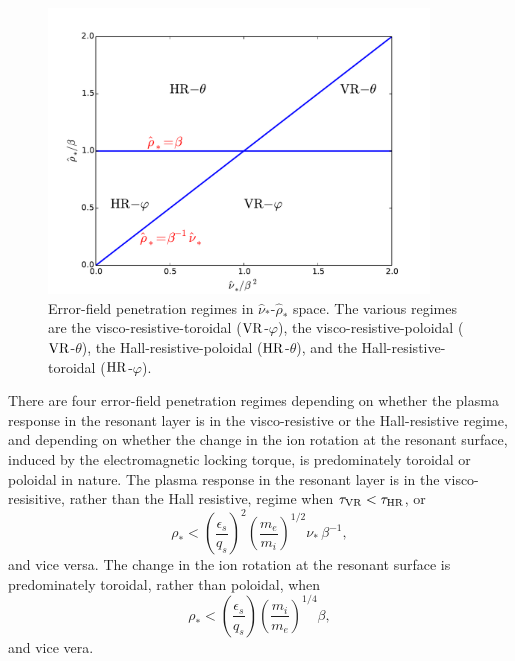 \documentclass[notitlepage,12pt]{article}
\begin{document}
\begin{figure}[t]
\centerline{\includegraphics[width=0.9\textwidth]{Scaling.pdf}}
\caption{Error-field penetration regimes in $\hat{\nu}_\ast$-$\hat{\rho}_\ast$ space. The various regimes are the
visco-resistive-toroidal (${\rm VR}$-$\varphi$), the visco-resistive-poloidal (${\rm VR}$-$\theta$), the Hall-resistive-poloidal (${\rm HR}$-$\theta$), and the  Hall-resistive-toroidal (${\rm HR}$-$\varphi$). }\label{f6}
\end{figure}

There are four error-field penetration regimes depending on whether the plasma response in the resonant layer is
in the visco-resistive or the Hall-resistive regime, and depending on whether the change in the ion rotation at the resonant surface, induced by the electromagnetic locking torque,  is
predominately toroidal or poloidal in nature. The plasma response in the resonant layer is in the
visco-resisitive, rather than the Hall resistive, regime when $\tau_{\rm VR}<\tau_{\rm HR}$, or
\begin{equation}
\rho_\ast < \left(\frac{\epsilon_s}{q_s}\right)^2\left(\frac{m_e}{m_i}\right)^{1/2}\nu_\ast\,\beta^{-1},
\end{equation}
and vice versa. The change in the ion rotation at the resonant surface is predominately toroidal, rather than poloidal, when
\begin{equation}
\rho_\ast < \left(\frac{\epsilon_s}{q_s}\right)\left(\frac{m_i}{m_e}\right)^{1/4}\beta,
\end{equation}
and vice vera. 
\end{document}
